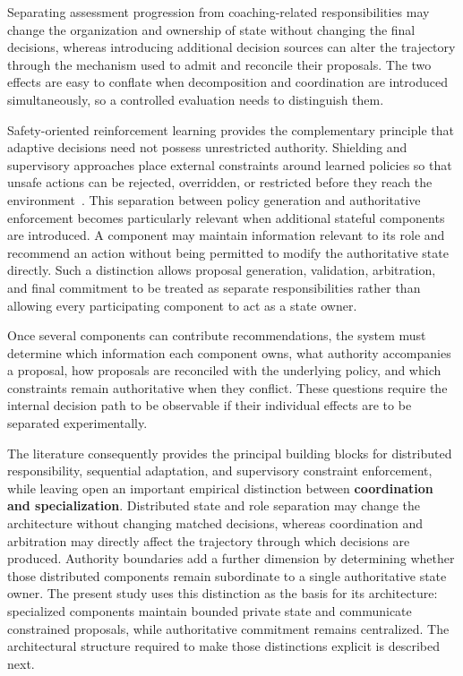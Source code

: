 Separating assessment progression from coaching-related responsibilities may change the organization and ownership of state without changing the final decisions, whereas introducing additional decision sources can alter the trajectory through the mechanism used to admit and reconcile their proposals. The two effects are easy to conflate when decomposition and coordination are introduced simultaneously, so a controlled evaluation needs to distinguish them.

Safety-oriented reinforcement learning provides the complementary principle that adaptive decisions need not possess unrestricted authority. Shielding and supervisory approaches place external constraints around learned policies so that unsafe actions can be rejected, overridden, or restricted before they reach the environment~\cite{shield,safe}. This separation between policy generation and authoritative enforcement becomes particularly relevant when additional stateful components are introduced. A component may maintain information relevant to its role and recommend an action without being permitted to modify the authoritative state directly. Such a distinction allows proposal generation, validation, arbitration, and final commitment to be treated as separate responsibilities rather than allowing every participating component to act as a state owner.

Once several components can contribute recommendations, the system must determine which information each component owns, what authority accompanies a proposal, how proposals are reconciled with the underlying policy, and which constraints remain authoritative when they conflict. These questions require the internal decision path to be observable if their individual effects are to be separated experimentally.

The literature consequently provides the principal building blocks for distributed responsibility, sequential adaptation, and supervisory constraint enforcement, while leaving open an important empirical distinction between \textbf{coordination and specialization}. Distributed state and role separation may change the architecture without changing matched decisions, whereas coordination and arbitration may directly affect the trajectory through which decisions are produced. Authority boundaries add a further dimension by determining whether those distributed components remain subordinate to a single authoritative state owner. The present study uses this distinction as the basis for its architecture: specialized components maintain bounded private state and communicate constrained proposals, while authoritative commitment remains centralized. The architectural structure required to make those distinctions explicit is described next.
